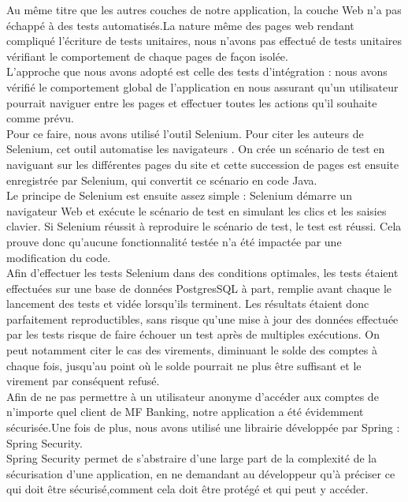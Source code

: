 Au même titre que les autres couches de notre application, la couche Web n'a pas échappé à des tests automatisés.La nature même des pages web rendant compliqué l'écriture de tests unitaires, nous n'avons pas effectué de tests unitaires vérifiant le comportement de chaque pages de façon isolée.\\
L'approche que nous avons adopté est celle des tests d'intégration : nous avons vérifié le comportement global de l'application en nous assurant qu'un utilisateur pourrait naviguer entre les pages et effectuer toutes les actions qu'il souhaite comme prévu.\\

Pour ce faire, nous avons utilisé l'outil Selenium. Pour citer les auteurs de Selenium, cet outil \og automatise les navigateurs \fg{}. On crée un scénario de test en naviguant sur les différentes pages du site et cette succession de pages est ensuite enregistrée par Selenium, qui convertit ce scénario en code Java.\\
Le principe de Selenium est ensuite assez simple : Selenium démarre un navigateur Web et exécute le scénario de test en simulant les clics et les saisies clavier. Si Selenium réussit à reproduire le scénario de test, le test est réussi. Cela prouve donc qu'aucune fonctionnalité testée n'a été impactée par une modification du code.\\

Afin d'effectuer les tests Selenium dans des conditions optimales, les tests étaient effectuées sur une base de données PostgresSQL à part, remplie avant chaque le lancement des tests et vidée lorsqu'ils terminent. Les résultats étaient donc parfaitement reproductibles, sans risque qu'une mise à jour des données effectuée par les tests  risque de faire échouer un test après de multiples exécutions.
On peut notamment citer le cas des virements, diminuant le solde des comptes à chaque fois, jusqu'au point où le solde pourrait ne plus être suffisant et le virement par conséquent refusé.\\

Afin de ne pas permettre à un utilisateur anonyme d'accéder aux comptes de n'importe quel client de MF Banking, notre application a été évidemment sécurisée.Une fois de plus, nous avons utilisé une librairie développée par Spring : Spring Security.\\
Spring Security permet de s'abstraire d'une large part de la complexité de la sécurisation d'une application, en ne demandant au développeur qu'à préciser ce qui doit \^etre sécurisé,comment cela doit être protégé et qui peut y accéder.
